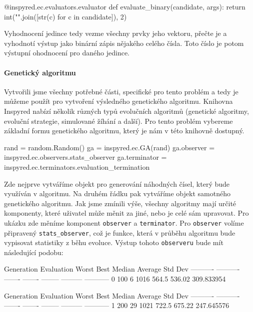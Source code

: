 \begin{code}
@inspyred.ec.evaluators.evaluator
def evaluate_binary(candidate, args):
    return int("".join([str(c) for c in candidate]), 2)
\end{code}

Vyhodnocení jedince tedy vezme všechny prvky jeho vektoru, přečte je a
vyhodnotí výstup jako binární zápis nějakého celého čísla. Toto číslo je potom
výstupní ohodnocení pro daného jedince.

\paragraph{Genetický algoritmu}
Vytvořili jsme všechny potřebné části, specifické pro tento problém a tedy je
můžeme použít pro vytvoření výsledného genetického algoritmu. Knihovna Inspyred
nabízí několik různých typů evolučních algoritmů (genetické algoritmy, evoluční
strategie, simulované žíhání a další). Pro tento problém vybereme
základní formu genetického algoritmu, který je nám v této knihovně dostupný.

\begin{code}
rand = random.Random()
ga = inspyred.ec.GA(rand)
ga.observer = inspyred.ec.observers.stats_observer
ga.terminator = inspyred.ec.terminators.evaluation_termination
\end{code}

Zde nejprve vytváříme objekt pro generování náhodných čísel, který bude
využíván v algoritmu. Na druhém řádku pak vytváříme objekt samotného
genetického algoritmu. Jak jsme zmínili výše, všechny algoritmy mají určité
komponenty, které uživatel může měnit za jiné, nebo je celé sám upravovat. Pro
ukázku zde měníme komponent \texttt{observer} a \texttt{terminator}. Pro
\texttt{observer} volíme připravený \texttt{stats\_observer}, což je funkce,
která v průběhu algoritmu bude vypisovat statistiky z běhu evoluce. Výstup
tohoto \texttt{observeru} bude mít následující podobu:

\begin{code}
Generation Evaluation   Worst    Best   Median   Average     Std Dev
---------- ---------- ------- ------- -------- --------- -----------      
         0        100       6    1016    564.5    536.02  309.833954

Generation Evaluation   Worst    Best   Median   Average     Std Dev
---------- ---------- ------- ------- -------- --------- -----------     
         1        200      29    1021    722.5    675.22  247.645576
\end{code}

